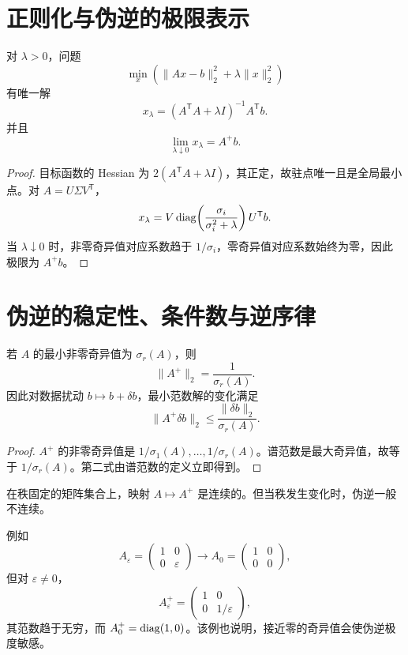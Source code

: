 \section{正则化与伪逆的极限表示}

\begin{theorem}
对 $\lambda>0$，问题
\[
\min_x\left(\lVert Ax-b\rVert_2^2
+\lambda\lVert x\rVert_2^2\right)
\]
有唯一解
\[
x_\lambda=(A^{\mathsf T}A+\lambda I)^{-1}A^{\mathsf T}b.
\]
并且
\[
\lim_{\lambda\downarrow0}x_\lambda=A^+b.
\]
\end{theorem}
\begin{proof}
目标函数的 Hessian 为
$2(A^{\mathsf T}A+\lambda I)$，其正定，故驻点唯一且是全局最小点。对 $A=U\Sigma V^{\mathsf T}$，
\[
x_\lambda
=V\operatorname{diag}\!\left(
\frac{\sigma_i}{\sigma_i^2+\lambda}
\right)U^{\mathsf T}b.
\]
当 $\lambda\downarrow0$ 时，非零奇异值对应系数趋于 $1/\sigma_i$，零奇异值对应系数始终为零，因此极限为 $A^+b$。
\end{proof}

\section{伪逆的稳定性、条件数与逆序律}

\begin{proposition}[伪逆范数]
若 $A$ 的最小非零奇异值为 $\sigma_r(A)$，则
\[
\lVert A^+\rVert_2=\frac1{\sigma_r(A)}.
\]
因此对数据扰动 $b\mapsto b+\delta b$，最小范数解的变化满足
\[
\lVert A^+\delta b\rVert_2
\le\frac{\lVert\delta b\rVert_2}{\sigma_r(A)}.
\]
\end{proposition}
\begin{proof}
$A^+$ 的非零奇异值是
$1/\sigma_1(A),\ldots,1/\sigma_r(A)$。谱范数是最大奇异值，故等于 $1/\sigma_r(A)$。第二式由谱范数的定义立即得到。
\end{proof}

\begin{theorem}[伪逆的连续性边界]
在秩固定的矩阵集合上，映射 $A\mapsto A^+$ 是连续的。但当秩发生变化时，伪逆一般不连续。
\end{theorem}

例如
\[
A_\varepsilon=\begin{pmatrix}1&0\\0&\varepsilon\end{pmatrix}
\longrightarrow
A_0=\begin{pmatrix}1&0\\0&0\end{pmatrix},
\]
但对 $\varepsilon\ne0$，
\[
A_\varepsilon^+
=\begin{pmatrix}1&0\\0&1/\varepsilon\end{pmatrix},
\]
其范数趋于无穷，而
$A_0^+=\operatorname{diag}(1,0)$。该例也说明，接近零的奇异值会使伪逆极度敏感。

